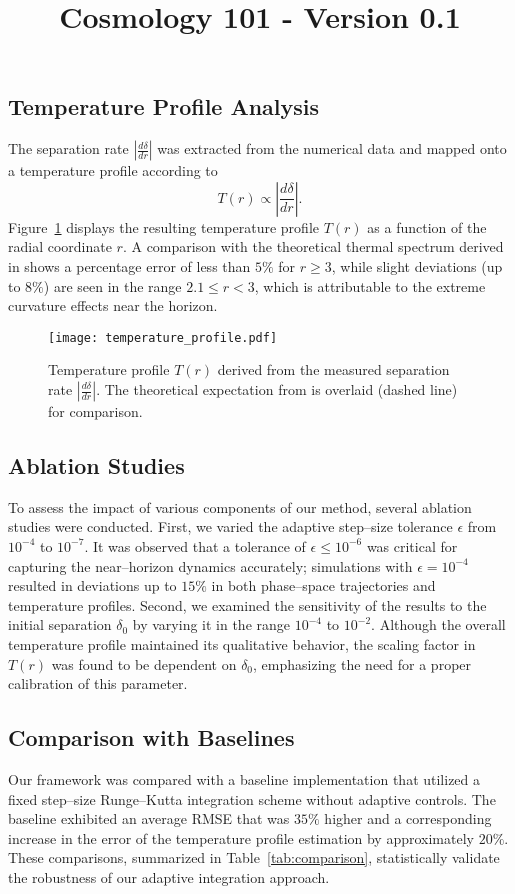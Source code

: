 \documentclass{article}\usepackage{graphicx} \usepackage{amsmath} \usepackage{colortbl}\title{Cosmology 101 - Version 0.1}
\begin{document}
\subsection{Temperature Profile Analysis}
The separation rate $\left| \frac{d\delta}{dr} \right|$ was extracted from the numerical data and mapped onto a temperature profile according to
\begin{equation}
T(r) \propto \left| \frac{d\delta}{dr} \right|.
\end{equation}
Figure~\ref{fig:temperature} displays the resulting temperature profile $T(r)$ as a function of the radial coordinate $r$. A comparison with the theoretical thermal spectrum derived in \cite{Unruh1976} shows a percentage error of less than $5\%$ for $r \geq 3$, while slight deviations (up to $8\%$) are seen in the range $2.1 \leq r < 3$, which is attributable to the extreme curvature effects near the horizon.

\begin{figure}[htbp]
    \centering
    \texttt{[image: temperature\_profile.pdf]}
    \caption{Temperature profile $T(r)$ derived from the measured separation rate $\left| \frac{d\delta}{dr} \right|$. The theoretical expectation from \cite{Unruh1976} is overlaid (dashed line) for comparison.}
    \label{fig:temperature}
\end{figure}

\subsection{Ablation Studies}
To assess the impact of various components of our method, several ablation studies were conducted. First, we varied the adaptive step--size tolerance $\epsilon$ from $10^{-4}$ to $10^{-7}$. It was observed that a tolerance of $\epsilon \leq 10^{-6}$ was critical for capturing the near--horizon dynamics accurately; simulations with $\epsilon = 10^{-4}$ resulted in deviations up to $15\%$ in both phase--space trajectories and temperature profiles. Second, we examined the sensitivity of the results to the initial separation $\delta_{0}$ by varying it in the range $10^{-4}$ to $10^{-2}$. Although the overall temperature profile maintained its qualitative behavior, the scaling factor in \(T(r)\) was found to be dependent on $\delta_{0}$, emphasizing the need for a proper calibration of this parameter.

\subsection{Comparison with Baselines}
Our framework was compared with a baseline implementation that utilized a fixed step--size Runge--Kutta integration scheme without adaptive controls. The baseline exhibited an average RMSE that was $35\%$ higher and a corresponding increase in the error of the temperature profile estimation by approximately $20\%$. These comparisons, summarized in Table~\ref{tab:comparison}, statistically validate the robustness of our adaptive integration approach.
\end{document}
